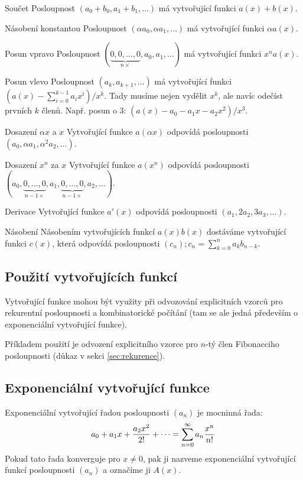 \begin{description*}
\item[Součet] Posloupnost $(a_0+b_0,a_1+b_1,\dots)$ má vytvořující funkci $a(x)+b(x)$.
\item[Násobení konstantou] Posloupnost $(\alpha a_0, \alpha a_1, \dots)$ má vytvořující funkci $\alpha a(x)$.
\item[Posun vpravo] Posloupnost $(\underbrace{0,0,\dots,0}_{n\times},a_0,a_1,\dots)$ má vytvořující funkci $x^na(x)$.
\item[Posun vlevo] Posloupnost $(a_k,a_{k+1},\dots)$ má vytvořující funkci $(a(x)-\sum_{i=0}^{k-1}a_ix^i)/x^k$. Tady musíme nejen vydělit $x^k$, ale navíc odečíst prvních $k$ členů. Např. posun o 3: $(a(x)-a_0-a_1x-a_2x^2)/x^3$.
\item[Dosazení $\alpha x$ a $x$] Vytvořující funkce $a(\alpha x)$ odpovídá posloupnosti $(a_0,\alpha a_1,\alpha^2 a_2,\dots)$.
\item[Dosazení $x^n$ za $x$] Vytvořující funkce $a(x^n)$ odpovídá posloupnosti $(a_0,\underbrace{0,\dots,0}_{n-1\times},a_1,\underbrace{0,\dots,0}_{n-1\times},a_2,\dots)$.
\item[Derivace] Vytvořující funkce $a'(x)$ odpovídá posloupnosti $(a_1,2a_2,3a_3,\dots)$.
\item[Násobení] Násobením vytvořujících funkcí $a(x)b(x)$ dostáváme vytvořující funkci $c(x)$, která odpovídá posloupnosti $(c_n); c_n = \sum_{k=0}^n a_kb_{n-k}$.
\end{description*}

\subsection{Použití vytvořujících funkcí}

Vytvořující funkce mohou být využity při odvozování explicitních vzorců pro rekurentní posloupnosti a kombinatorické počítání (tam se ale jedná především o exponenciální vytvořující funkce). 

Příkladem použití je odvození explicitního vzorce pro $n$-tý člen Fibonacciho posloupnosti (důkaz v sekci \ref{sec:rekurence}).

\subsection{Exponenciální vytvořující funkce}
\df Exponenciální vytvořující řadou posloupnosti $(a_n)$ je mocninná řada:
$$a_0 + a_1x + {a_2x^2 \over 2!} + \dots = \sum_{n=0}^\infty a_n{x^n\over n!}$$
Pokud tato řada konverguje pro $x \neq 0$, pak ji nazveme exponenciální vytvořující funkcí posloupnosti $(a_n)$ a označíme ji $A(x)$.


